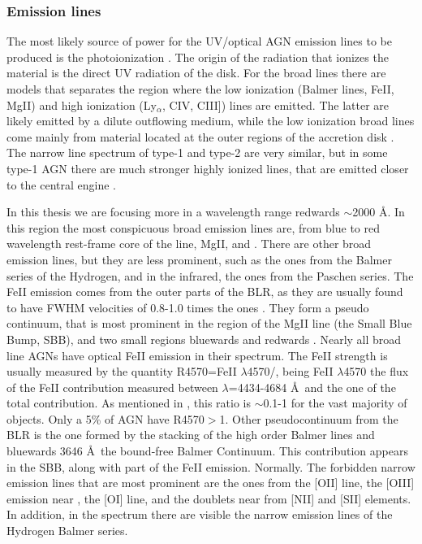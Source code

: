 \subsubsection{Emission lines}
\label{sec1:liem}

The most likely source of power for the UV/optical AGN emission lines to be produced is the photoionization \citep{netzer90}. The origin of the radiation that ionizes the material is the direct UV radiation of the disk. For the broad lines there are models that separates the region where the low ionization (Balmer lines, FeII, MgII) and high ionization (Ly$_{\alpha}$, CIV, CIII]) lines are emitted. The latter are likely emitted by a dilute outflowing medium, while the low ionization broad lines come mainly from material located at the outer regions of the accretion disk \citep{netzer90}. The narrow line spectrum of type-1 and type-2 are very similar, but in some type-1 AGN there are much stronger highly ionized lines, that are emitted closer to the central engine \citep{ferguson97}.

In this thesis we are focusing more in a wavelength range redwards $\sim$2000 \AA. In this region the most conspicuous broad emission lines are, from blue to red wavelength rest-frame core of the line, MgII, \Hb and \Ha. There are other broad emission lines, but they are less prominent, such as the ones from the Balmer series of the Hydrogen, and in the infrared, the ones from the Paschen series. The FeII emission comes from the outer parts of the BLR, as they are usually found to have FWHM velocities of 0.8-1.0 times the \Hb ones \citep{osterbrock91}. They form a pseudo continuum, that is most prominent in the region of the MgII line (the Small Blue Bump, SBB), and two small regions bluewards and redwards \Hb. Nearly all broad line AGNs have optical FeII emission in their spectrum. The FeII strength is usually measured by the quantity R4570=FeII $\lambda$4570/\Hb, being  FeII $\lambda$4570 the flux of the FeII contribution measured between $\lambda$=4434-4684 \AA~and \Hb the one of the total \Hb contribution. As mentioned in \cite{veroncetty00}, this ratio is $\sim$0.1-1 for the vast majority of objects. Only a 5\% of AGN have R4570$>$1. Other pseudocontinuum from the BLR is the one formed by the stacking of the high order Balmer lines and bluewards 3646 \AA~the bound-free Balmer Continuum. This contribution appears in the SBB, along with part of the FeII emission. Normally. The forbidden narrow emission lines that are most prominent are the ones from the [OII] line, the [OIII] emission near \Hb, the [OI] line, and the doublets near \Ha from [NII] and [SII] elements. In addition, in the spectrum there are visible the narrow emission lines of the Hydrogen Balmer series.


